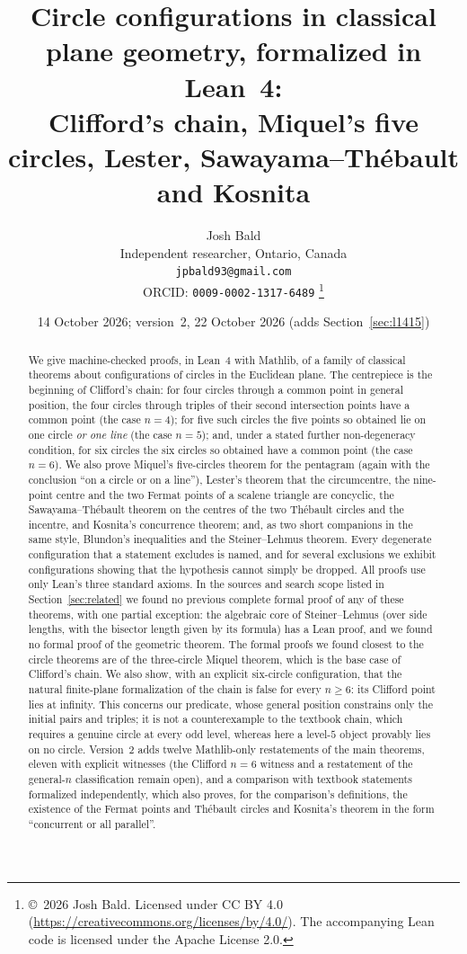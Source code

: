 \documentclass[11pt]{article}
\title{Circle configurations in classical plane geometry, formalized in Lean~4:\\
Clifford's chain, Miquel's five circles, Lester, Sawayama--Th\'ebault and Kosnita}
\author{Josh Bald\\ \small Independent researcher, Ontario, Canada\\ \small\texttt{jpbald93@gmail.com}\\
\small ORCID: \texttt{0009-0002-1317-6489}
\thanks{\copyright~2026 Josh Bald. Licensed under CC BY 4.0 (\url{https://creativecommons.org/licenses/by/4.0/}). The accompanying Lean code is licensed under the Apache License 2.0.}}
\date{14 October 2026; version~2, 22 October 2026 (adds Section~\ref{sec:l1415})}
\theoremstyle{definition}
\theoremstyle{remark}
\begin{document}
\sloppy
\maketitle

\begin{abstract}
We give machine-checked proofs, in Lean~4 with Mathlib, of a family of classical theorems about
configurations of circles in the Euclidean plane. The centrepiece is the beginning of Clifford's
chain: for four circles through a common point in general position, the four circles through
triples of their second intersection points have a common point (the case $n=4$); for five such
circles the five points so obtained lie on one circle \emph{or one line} (the case $n=5$); and, under
a stated further non-degeneracy condition, for six circles the six circles so obtained have a common
point (the case $n=6$). We also prove Miquel's five-circles theorem for the pentagram (again with
the conclusion ``on a circle or on a line''), Lester's theorem that the circumcentre, the
nine-point centre and the two Fermat points of a scalene triangle are concyclic, the
Sawayama--Th\'ebault theorem on the centres of the two Th\'ebault circles and the incentre, and
Kosnita's concurrence theorem; and, as two short companions in the same style, Blundon's
inequalities and the Steiner--Lehmus theorem. Every degenerate configuration that a statement
excludes is named, and for several exclusions we exhibit configurations showing that the hypothesis
cannot simply be dropped. All proofs use only Lean's three standard axioms.
In the sources and search scope listed in Section~\ref{sec:related} we found no previous complete formal
proof of any of these theorems, with one partial exception: the algebraic core of Steiner--Lehmus
(over side lengths, with the bisector length given by its formula) has a Lean proof, and we found no
formal proof of the geometric theorem. The formal proofs we found closest to the circle theorems are of
the three-circle Miquel theorem, which is the base case of Clifford's chain. We also show, with an
explicit six-circle configuration, that the natural finite-plane formalization of the chain is false
for every $n\ge6$: its Clifford point lies at infinity. This concerns our predicate, whose general
position constrains only the initial pairs and triples; it is not a counterexample to the textbook
chain, which requires a genuine circle at every odd level, whereas here a level-$5$ object provably lies on
no circle. Version~2 adds twelve Mathlib-only restatements of the
main theorems, eleven with explicit witnesses (the Clifford $n=6$ witness and a restatement of the
general-$n$ classification remain open), and a comparison with textbook statements formalized
independently, which also proves, for the comparison's definitions, the existence of the Fermat points
and Th\'eb\-ault circles and Kosnita's theorem in the form ``concurrent or all parallel''.
\end{abstract}
\end{document}
